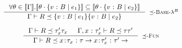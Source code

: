 \hfill{}\\

$$
\inference{
        \forall \theta\in\interp{\env}.
        \interp{\applysub{\theta}{\tref{v}{\btyp}{\refa_1}}}
        \subseteq
        \interp{\applysub{\theta}{\tref{v}{\btyp}{\refa_2}}}
}{
        \issubtype{\env}{\RRenv}{\tref{v}{\btyp}{\refa_1}}{\tref{v}{\btyp}{\refa_2}}
}[\rsubbasecore]
$$

$$
\inference{
	\issubtype{\env}{\RRenv}{\typ_x'}{\typ_x} &
	\issubtype{\env,\tbind{x}{\typ_x'}}{\RRenv}{\typ}{\typ'}
}{
	\issubtype{\env}{\RRenv}{\trfun{x}{\typ_x}{\typ}}{\trfun{x}{\typ_x'}{\typ'}}
}[\rsubfun]
$$